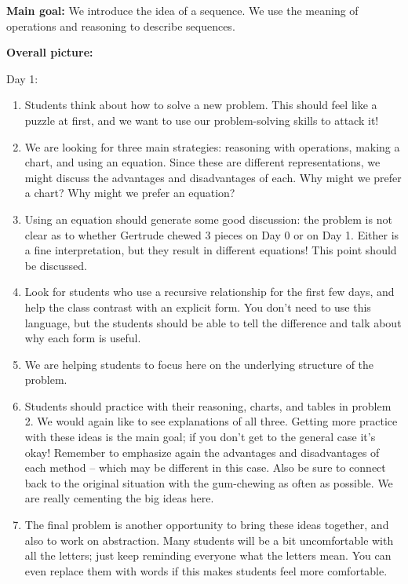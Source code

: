 \documentclass[noauthor,nooutcomes,handout]{ximera}
\begin{document}
\begin{instructorNotes}
{\bf Main goal:} We introduce the idea of a sequence. We use the meaning of operations and reasoning to describe sequences.


{\bf Overall picture:}

Day 1:
\begin{enumerate}
\item Students think about how to solve a new problem. This should feel like a puzzle at first, and we want to use our problem-solving skills to attack it!
\item We are looking for three main strategies: reasoning with operations, making a chart, and using an equation. Since these are different representations, we might discuss the advantages and disadvantages of each. Why might we prefer a chart? Why might we prefer an equation?
\item Using an equation should generate some good discussion: the problem is not clear as to whether Gertrude chewed 3 pieces on Day 0 or on Day 1. Either is a fine interpretation, but they result in different equations! This point should be discussed.
\item Look for students who use a recursive relationship for the first few days, and help the class contrast with an explicit form. You don't need to use this language, but the students should be able to tell the difference and talk about why each form is useful.

\item We are helping students to focus here on the underlying structure of the problem.

	\item Students should practice with their reasoning, charts, and tables in problem 2. We would again like to see explanations of all three. Getting more practice with these ideas is the main goal; if you don't get to the general case it's okay! Remember to emphasize again the advantages and disadvantages of each method -- which may be different in this case. Also be sure to connect back to the original situation with the gum-chewing as often as possible. We are really cementing the big ideas here.
	\item The final problem is another opportunity to bring these ideas together, and also to work on abstraction. Many students will be a bit uncomfortable with all the letters; just keep reminding everyone what the letters mean. You can even replace them with words if this makes students feel more comfortable.
\end{enumerate}



\end{instructorNotes}
\end{document}
